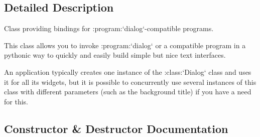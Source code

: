 \subsection{Detailed Description}
\begin{DoxyVerb}Class providing bindings for :program:`dialog`-compatible programs.

This class allows you to invoke :program:`dialog` or a compatible
program in a pythonic way to quickly and easily build simple but
nice text interfaces.

An application typically creates one instance of the :class:`Dialog`
class and uses it for all its widgets, but it is possible to
concurrently use several instances of this class with different
parameters (such as the background title) if you have a need for
this.\end{DoxyVerb}
 

\subsection{Constructor \& Destructor Documentation}
